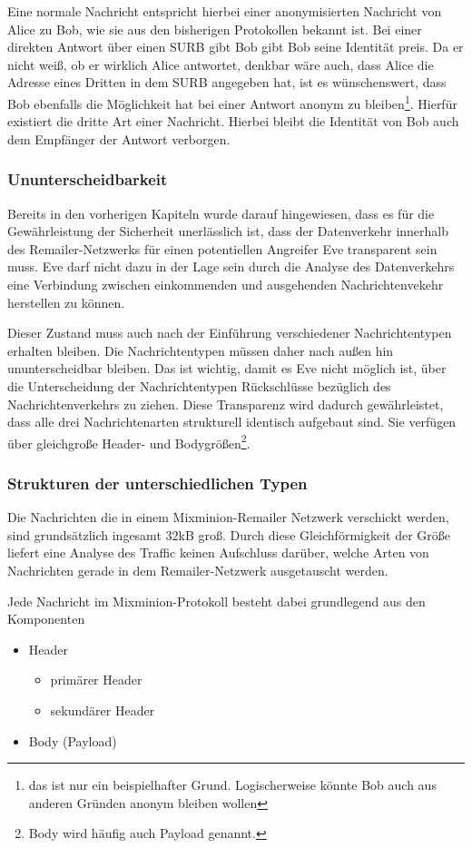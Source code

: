 Eine normale Nachricht entspricht hierbei einer anonymisierten Nachricht von Alice zu Bob, wie sie aus den bisherigen Protokollen bekannt ist. Bei einer direkten Antwort über einen SURB gibt Bob gibt Bob seine Identität preis. Da er nicht weiß, ob er wirklich Alice antwortet, denkbar wäre auch, dass Alice die Adresse eines Dritten in dem SURB angegeben hat, ist es wünschenswert, dass Bob ebenfalls die Möglichkeit hat bei einer Antwort anonym zu bleiben\footnote{das ist nur ein beispielhafter Grund. Logischerweise könnte Bob auch aus anderen Gründen anonym bleiben wollen}. Hierfür existiert die dritte Art einer Nachricht. Hierbei bleibt die Identität von Bob auch dem Empfänger der Antwort verborgen.

\subsubsection{Ununterscheidbarkeit}
Bereits in den vorherigen Kapiteln wurde darauf hingewiesen, dass es für die Gewährleistung der Sicherheit unerlässlich ist, dass der Datenverkehr innerhalb des Remailer-Netzwerks für einen potentiellen Angreifer Eve transparent sein muss. Eve darf nicht dazu in der Lage sein durch die Analyse des Datenverkehrs eine Verbindung zwischen einkommenden und ausgehenden Nachrichtenvekehr herstellen zu können.

Dieser Zustand muss auch nach der Einführung verschiedener Nachrichtentypen erhalten bleiben.  Die Nachrichtentypen müssen daher nach außen hin ununterscheidbar bleiben. Das ist wichtig, damit es Eve nicht möglich ist, über die Unterscheidung der Nachrichtentypen Rückschlüsse bezüglich des Nachrichtenverkehrs zu ziehen. Diese Transparenz wird dadurch gewährleistet, dass alle drei Nachrichtenarten strukturell identisch aufgebaut sind. Sie verfügen über gleichgroße Header- und Bodygrößen\footnote{Body wird häufig auch Payload genannt.}.

\subsubsection{Strukturen der unterschiedlichen Typen}
Die Nachrichten die in einem Mixminion-Remailer Netzwerk verschickt werden, sind grundsätzlich ingesamt 32kB groß. Durch diese Gleichförmigkeit der Größe liefert eine Analyse des Traffic keinen Aufschluss darüber, welche Arten von Nachrichten gerade in dem Remailer-Netzwerk ausgetauscht werden.

Jede Nachricht im Mixminion-Protokoll besteht dabei grundlegend aus den Komponenten 
\begin{itemize}
\item Header
	\begin{itemize}
	\item primärer Header
	\item sekundärer Header
	\end{itemize}
\item Body (Payload)
\end{itemize}

